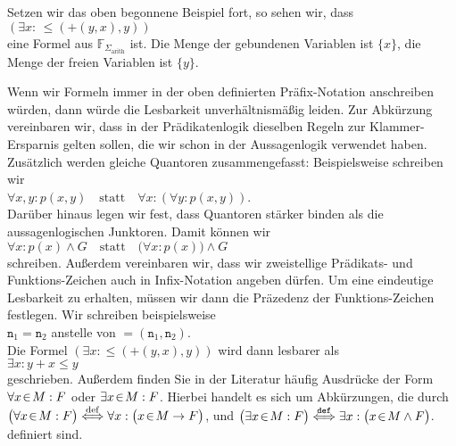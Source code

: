 \example
Setzen wir das oben begonnene Beispiel fort, so  sehen wir, dass \\[0.2cm]
\hspace*{1.3cm} $(\exists x \colon\, \leq\!(\mathtt{+}(y, x),y))$ \\[0.2cm]
eine Formel aus $\mathbb{F}_{\Sigma_{\mathrm{arith}}}$ ist. 
Die Menge der gebundenen Variablen ist $\{x\}$, die Menge der freien Variablen ist 
$\{ y \}$. \eox

Wenn wir Formeln immer in der oben definierten Präfix-Notation anschreiben würden, dann würde die Lesbarkeit unverhältnismäßig leiden. 
Zur Abkürzung vereinbaren wir, dass in der Prädikatenlogik dieselben Regeln zur Klammer-Ersparnis
gelten sollen,  die wir schon in der Aussagenlogik verwendet haben.  Zusätzlich werden
gleiche Quantoren zusammengefasst: Beispielsweise schreiben wir  
\\[0.2cm]
\hspace*{1.3cm}
$\forall x, y \colon p(x, y)  \quad \mathrm{statt} \quad \forall x \colon ( \forall y \colon p(x,y))$.
\\[0.2cm]
Darüber hinaus legen wir fest, dass Quantoren stärker binden als die aussagenlogischen Junktoren.
Damit können wir
\\[0.2cm]
\hspace*{1.3cm}
$\forall x \colon p(x) \wedge G \quad \mathrm{statt} \quad \bigl(\forall x \colon p(x)\bigr) \wedge G$
\\[0.2cm]
schreiben.
Außerdem vereinbaren wir, dass wir zweistellige Prädikats- und Funktions-Zeichen auch in Infix-Notation angeben
dürfen.  Um eine eindeutige Lesbarkeit zu erhalten, müssen wir dann die Präzedenz der Funktions-Zeichen
festlegen.  Wir schreiben beispielsweise \\[0.2cm]
\hspace*{1.3cm} $\mathtt{n}_1 = \mathtt{n}_2$  \quad anstelle von \quad $=(\mathtt{n}_1, \mathtt{n}_2)$. \\[0.2cm]
Die Formel $(\exists x \colon \leq(\mathtt{+}(y, x),y))$ wird dann lesbarer als \\[0.2cm]
\hspace*{1.3cm} $\exists x \colon y + x \leq y$ \\[0.2cm]
geschrieben.  Außerdem finden Sie in der Literatur häufig Ausdrücke der Form
$\forall x\!\in\! M: F$ oder $\exists x\!\in\! M: F$.  Hierbei handelt es sich um Abkürzungen, die durch
\\[0.2cm]
\hspace*{1.3cm}
$\displaystyle \bigl(\forall x\!\in\! M: F\bigr) \stackrel{\mathrm{def}}{\Longleftrightarrow} \forall x: \bigl(x \!\in\! M \rightarrow F\bigr)$,
\quad und \quad 
$\displaystyle\bigl(\exists x\!\in\! M: F\bigr) \stackrel{\mathtt{def}}{\Longleftrightarrow} \exists x: \bigl(x \!\in\! M \wedge F\bigr)$.
\\[0.2cm]
definiert sind.

